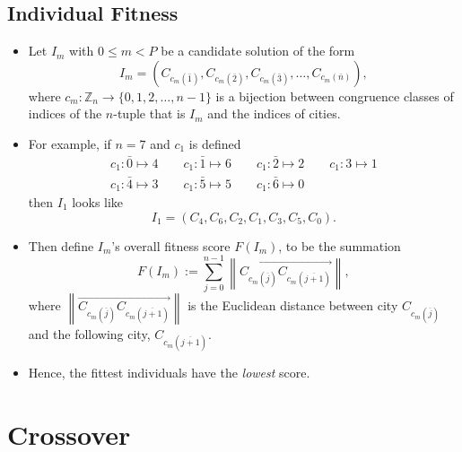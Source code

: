 \documentclass[xcolor={usenames,dvipsnames,svgnames}]{beamer}
\begin{document}
\subsection{Individual Fitness}
\begin{frame}
\begin{itemize}
	\item<1-> Let $I_m$ with $0 \leqslant m < P$ be a candidate solution of the form 
	\begin{equation*}
	I_m = \left(C_{c_m(\bar 1)}, C_{c_m(\bar 2)}, C_{c_m(\bar 3)}, \ldots, C_{c_m(\bar n)}\right),
	\end{equation*}
	where $c_m\colon \mathbb Z_n \to \{0, 1, 2, \ldots, n-1\}$ is a bijection between congruence classes of indices of the $n$-tuple that is $I_m$ and the indices of cities. 
	\item<2-> For example, if $n = 7$ and $c_1$ is defined 
	\begin{gather*}
	c_1\colon \bar 0 \mapsto 4 \qquad c_1\colon \bar 1 \mapsto 6 \qquad c_1\colon \bar 2 \mapsto 2 \qquad c_1\colon 3 \mapsto 1 \\
	c_1\colon \bar 4 \mapsto 3 \qquad c_1\colon \bar 5 \mapsto 5 \qquad c_1\colon \bar 6 \mapsto 0
	\end{gather*}
	then $I_1$ looks like
	\begin{equation*}
	I_1 = \left( C_4, C_6, C_2, C_1, C_3, C_5, C_0 \right).
	\end{equation*}
\end{itemize}
\end{frame}

\begin{frame}
\begin{itemize}
	\item<1-> Then define $I_m$'s overall fitness score $F(I_m)$, to be the summation
	\begin{equation*}
	F(I_m) := \sum_{j = 0}^{n-1} \left\lVert\overrightarrow{C_{c_m(\overline{j})} C_{c_m(\overline{j+1})}}\right\rVert,
	\end{equation*}
	where $\left\lVert\overrightarrow{C_{c_m(\overline{j})} C_{c_m(\overline{j+1})}}\right\rVert$ is the Euclidean distance between city $C_{c_m(\overline{j})}$ and the following city, $C_{c_m(\overline{j+1})}$. 
	\item<2-> Hence, the fittest individuals have the {\em lowest} score.
\end{itemize}
\end{frame}

\section{Crossover}
\end{document}
